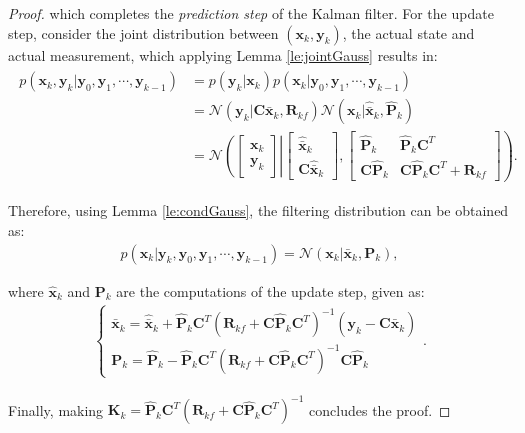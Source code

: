 \documentclass[a4paper,11pt]{book}
\numberwithin{figure}{chapter}
\numberwithin{equation}{chapter}
\numberwithin{table}{chapter}
\theoremstyle{definition}
\begin{document}
\begin{proof}
    \noindent which completes the \textit{prediction step} of the Kalman filter. For the update step, consider the joint distribution between $(\bm{x}_k, \bm{y}_k)$, the actual state and actual measurement, which applying Lemma \ref{le:jointGauss} results in:
    \begin{align}
    \begin{split}
        p(\bm{x}_k, \bm{y}_{k} | \bm{y}_0, \bm{y}_1, \cdots, \bm{y}_{k-1}) &= p(\bm{y}_k | \bm{x}_{k}) p(\bm{x}_{k} | \bm{y}_0, \bm{y}_1, \cdots, \bm{y}_{k-1}) \\
        &= \mathcal{N}(\bm{y}_k | \bm{C}\bar{\bm{x}}_{k}, \bm{R}_{kf}) \mathcal{N}(\bm{x}_{k} | \hat{\bar{\bm{x}}}_k, \hat{\bm{P}}_k) \\
        &= \mathcal{N}\left( \begin{bmatrix} \bm{x}_{k} \\ \bm{y}_{k} \end{bmatrix}  \right| \left. \begin{bmatrix} \hat{\bar{\bm{x}}}_k \\ \bm{C}\hat{\bar{\bm{x}}}_k \end{bmatrix}, \begin{bmatrix} \hat{\bm{P}}_k & \hat{\bm{P}}_k \bm{C}^T  \\ \bm{C} \hat{\bm{P}}_k & \bm{C} \hat{\bm{P}}_k \bm{C}^T + \bm{R}_{kf} \end{bmatrix}   \right).
    \end{split}
    \end{align}
    
    Therefore, using Lemma \ref{le:condGauss}, the filtering distribution can be obtained as:
    \begin{align}
        p(\bm{x}_k | \bm{y}_k, \bm{y}_0, \bm{y}_1, \cdots, \bm{y}_{k-1}) = \mathcal{N}(\bm{x}_k | \bar{\bm{x}}_k, \bm{P}_k)
    ,\end{align}

    \noindent where $\hat{\bm{x}}_k$ and $\bm{P}_k$ are the computations of the update step, given as:
    \begin{align}
    \begin{cases}
        \bar{\bm{x}}_k = \hat{\bar{\bm{x}}}_k + \hat{\bm{P}}_k \bm{C}^T (\bm{R}_{kf} + \bm{C} \hat{\bm{P}}_k \bm{C}^T)^{-1}(\bm{y}_k - \bm{C}\hat{\bar{\bm{x}}}_k) \\
        \bm{P}_k = \hat{\bm{P}}_k - \hat{\bm{P}}_k \bm{C}^T (\bm{R}_{kf} + \bm{C} \hat{\bm{P}}_k \bm{C}^T)^{-1} \bm{C} \hat{\bm{P}}_k
    \end{cases}
    .\end{align}
    
    \noindent Finally, making $\bm{K}_k = \hat{\bm{P}}_k \bm{C}^T (\bm{R}_{kf} + \bm{C} \hat{\bm{P}}_k \bm{C}^T)^{-1}$ concludes the proof.
\end{proof}
\end{document}
